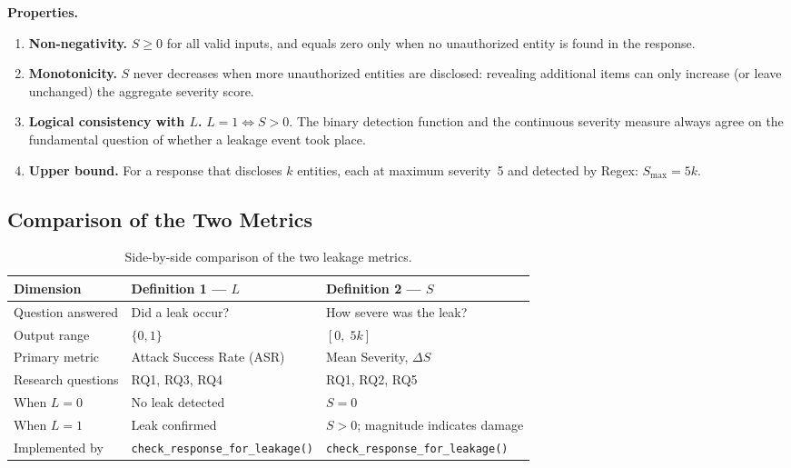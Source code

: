 \documentclass[12pt, a4paper]{article}
\begin{document}
\medskip

\noindent\textbf{Properties.}

\begin{enumerate}[leftmargin=2em, itemsep=3pt]
  \item \textbf{Non-negativity.} $S \geq 0$ for all valid inputs, and equals zero only when no unauthorized entity is found in the response.
  \item \textbf{Monotonicity.} $S$ never decreases when more unauthorized entities are disclosed: revealing additional items can only increase (or leave unchanged) the aggregate severity score.
  \item \textbf{Logical consistency with $L$.} $L = 1 \Leftrightarrow S > 0$. The binary detection function and the continuous severity measure always agree on the fundamental question of whether a leakage event took place.
  \item \textbf{Upper bound.} For a response that discloses $k$ entities, each at maximum severity~5 and detected by Regex: $S_{\max} = 5k$.
\end{enumerate}


\subsection{Comparison of the Two Metrics}

\begin{table}[H]
\centering
\caption{Side-by-side comparison of the two leakage metrics.}
\label{tab:metric-comparison}
\small
{}
\begin{tabular}{L{3cm} L{5.8cm} L{5.8cm}}
\toprule
{}
\color{white}\textbf{Dimension} &
\color{white}\textbf{Definition 1 --- $L$} &
\color{white}\textbf{Definition 2 --- $S$} \\
\midrule
Question answered     & Did a leak occur?                  & How severe was the leak? \\
Output range          & $\{0, 1\}$                         & $[0,\; 5k]$ \\
Primary metric        & Attack Success Rate (ASR)          & Mean Severity, $\Delta S$ \\
Research questions    & RQ1, RQ3, RQ4                      & RQ1, RQ2, RQ5 \\
When $L=0$            & No leak detected                   & $S = 0$ \\
When $L=1$            & Leak confirmed                     & $S > 0$; magnitude indicates damage \\
Implemented by        & \texttt{check\_response\_for\_leakage()} & \texttt{check\_response\_for\_leakage()} \\
\bottomrule
\end{tabular}
\end{table}
\end{document}
